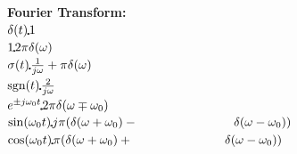\begin{landscape}
\begin{minipage}{0.2\linewidth}
\textbf{Fourier Transform:}\\

$\delta(t)\FT 1$\\
$1\FT 2\pi \delta(\omega)$\\
$\sigma(t)\FT \frac{1}{j\omega}+\pi\delta(\omega)$\\
$\text{sgn}(t)\FT \frac{2}{j\omega}$\\
$e^{\pm j \omega_0 t} \FT 2\pi \delta(\omega \mp \omega_0)$\\
$\sin(\omega_0t)\FT j\pi(\delta(\omega +\omega_0)-\newline\text{\hspace{2.7cm}}\delta(\omega -\omega_0))$\\
$\cos(\omega_0t)\FT \pi(\delta(\omega +\omega_0)+\newline\text{\hspace{2.6cm}}\delta(\omega -\omega_0))$\\
\end{minipage}

\end{landscape}